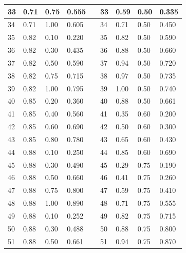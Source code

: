 \documentclass{article}
\begin{document}
\begin{doublespacing}
\begin{appendices}
\begin{longtable}[c]{|l|l|l|l|
>{\columncolor[HTML]{333333}}l |l|l|l|l|}
33             & 0.71    & 0.75  & 0.555  &  & 33           & 0.59    & 0.50  & 0.335  \\ \hline
34             & 0.71    & 1.00  & 0.605  &  & 34           & 0.71    & 0.50  & 0.450  \\ \hline
35             & 0.82    & 0.10  & 0.220  &  & 35           & 0.82    & 0.50  & 0.590  \\ \hline
36             & 0.82    & 0.30  & 0.435  &  & 36           & 0.88    & 0.50  & 0.660  \\ \hline
37             & 0.82    & 0.50  & 0.590  &  & 37           & 0.94    & 0.50  & 0.720  \\ \hline
38             & 0.82    & 0.75  & 0.715  &  & 38           & 0.97    & 0.50  & 0.735  \\ \hline
39             & 0.82    & 1.00  & 0.795  &  & 39           & 1.00    & 0.50  & 0.740  \\ \hline
40             & 0.85    & 0.20  & 0.360  &  & 40           & 0.88    & 0.50  & 0.661  \\ \hline
41             & 0.85    & 0.40  & 0.560  &  & 41           & 0.35    & 0.60  & 0.200  \\ \hline
42             & 0.85    & 0.60  & 0.690  &  & 42           & 0.50    & 0.60  & 0.300  \\ \hline
43             & 0.85    & 0.80  & 0.780  &  & 43           & 0.65    & 0.60  & 0.430  \\ \hline
44             & 0.88    & 0.10  & 0.250  &  & 44           & 0.85    & 0.60  & 0.690  \\ \hline
45             & 0.88    & 0.30  & 0.490  &  & 45           & 0.29    & 0.75  & 0.190  \\ \hline
46             & 0.88    & 0.50  & 0.660  &  & 46           & 0.41    & 0.75  & 0.260  \\ \hline
47             & 0.88    & 0.75  & 0.800  &  & 47           & 0.59    & 0.75  & 0.410  \\ \hline
48             & 0.88    & 1.00  & 0.890  &  & 48           & 0.71    & 0.75  & 0.555  \\ \hline
49             & 0.88    & 0.10  & 0.252  &  & 49           & 0.82    & 0.75  & 0.715  \\ \hline
50             & 0.88    & 0.30  & 0.488  &  & 50           & 0.88    & 0.75  & 0.800  \\ \hline
51             & 0.88    & 0.50  & 0.661  &  & 51           & 0.94    & 0.75  & 0.870  \\ \hline

\end{longtable}
\end{appendices}
\end{doublespacing}
\end{document}

